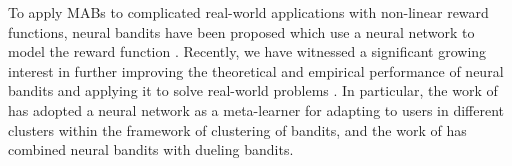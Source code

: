 To apply MABs to complicated real-world applications with non-linear reward functions, neural bandits have been proposed which use a neural network to model the reward function \cite{zhou2020neural,zhang2020neural}.
Recently, we have witnessed a significant growing interest in further improving the theoretical and empirical performance of neural bandits and applying it to solve real-world problems \cite{xu2020neural,kassraie2021neural,gu2021batched,nabati2021online,lisicki2021empirical,ban2021ee,ban2021convolutional,jia2021learning,nguyen2021offline,zhu2021pure,kassraie2022graph,salgia2022provably,dai2022sample,hwang2023combinatorial,qi2023graph,qi2024meta}.
In particular, the work of \citet{ban2024meta} has adopted a neural network as a meta-learner for adapting to users in different clusters within the framework of clustering of bandits, and the work of \citet{verma2024neural} has combined neural bandits with dueling bandits.